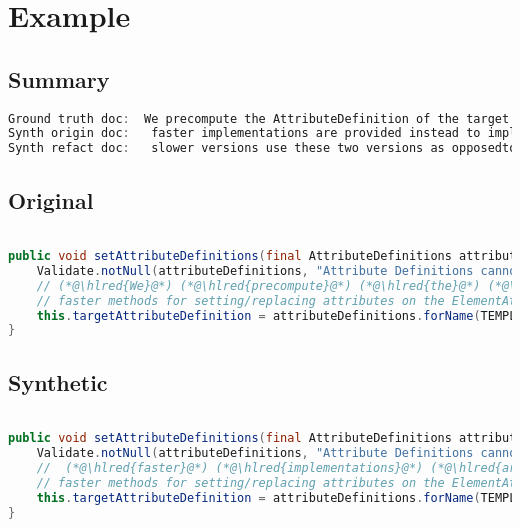 \documentclass[11pt]{article}
\DeclareRobustCommand{\hlred}[1]{{\sethlcolor{YellowOrange}\hl{#1}}}
\begin{document}
  \pagebreak
  \section{Example}
  \subsection{Summary}

  \begin{lstlisting}[language=java]
Ground truth doc:  We precompute the AttributeDefinition of the target attribute in order to being able to use much
Synth origin doc:   faster implementations are provided instead to implement additional and more sophisticated or intuitive or useful but
Synth refact doc:   slower versions use these two versions as opposedto using this class which also defines more
  \end{lstlisting}

  \subsection{Original}
  \begin{lstlisting}[language=java]

public void setAttributeDefinitions(final AttributeDefinitions attributeDefinitions) {
    Validate.notNull(attributeDefinitions, "Attribute Definitions cannot be null");
    // (*@\hlred{We}@*) (*@\hlred{precompute}@*) (*@\hlred{the}@*) (*@\hlred{AttributeDefinition}@*) (*@\hlred{of}@*) (*@\hlred{the}@*) (*@\hlred{target}@*) (*@\hlred{attribute}@*) (*@\hlred{in}@*) (*@\hlred{order}@*) (*@\hlred{to}@*) (*@\hlred{being}@*) (*@\hlred{able}@*) (*@\hlred{to}@*) (*@\hlred{use}@*) (*@\hlred{much}@*)
    // faster methods for setting/replacing attributes on the ElementAttributes implementation
    this.targetAttributeDefinition = attributeDefinitions.forName(TEMPLATE_MODE, TARGET_ATTR_NAME);
}
  \end{lstlisting}
  \subsection{Synthetic}

  \begin{lstlisting}[language=java]

public void setAttributeDefinitions(final AttributeDefinitions attributeDefinitions) {
    Validate.notNull(attributeDefinitions, "Attribute Definitions cannot be null");
    //  (*@\hlred{faster}@*) (*@\hlred{implementations}@*) (*@\hlred{are}@*) (*@\hlred{provided}@*) (*@\hlred{instead}@*) (*@\hlred{to}@*) (*@\hlred{implement}@*) (*@\hlred{additional}@*) (*@\hlred{and}@*) (*@\hlred{more}@*) (*@\hlred{sophisticated}@*) (*@\hlred{or}@*) (*@\hlred{intuitive}@*) (*@\hlred{or}@*) (*@\hlred{useful}@*) (*@\hlred{but}@*)
    // faster methods for setting/replacing attributes on the ElementAttributes implementation
    this.targetAttributeDefinition = attributeDefinitions.forName(TEMPLATE_MODE, TARGET_ATTR_NAME);
}
  \end{lstlisting}
\end{document}
